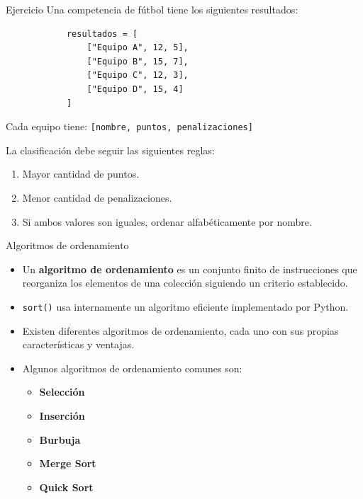 \documentclass{beamer}
\begin{document}
    \begin{frame}[fragile, t]{Ejercicio}
        Una competencia de fútbol tiene los siguientes resultados:
        \begin{verbatim}
            resultados = [
                ["Equipo A", 12, 5],
                ["Equipo B", 15, 7],
                ["Equipo C", 12, 3],
                ["Equipo D", 15, 4]
            ]
        \end{verbatim}
        Cada equipo tiene: \texttt{[nombre, puntos, penalizaciones]}

        La clasificación debe seguir las siguientes reglas:
        \begin{enumerate}
            \item Mayor cantidad de puntos.
            \item Menor cantidad de penalizaciones.
            \item Si ambos valores son iguales, ordenar alfabéticamente por nombre.
        \end{enumerate}
    \end{frame}

    \begin{frame}{Algoritmos de ordenamiento}
        \begin{itemize}
            \item Un \textbf{algoritmo de ordenamiento} es un conjunto finito de instrucciones 
            que reorganiza los elementos de una colección siguiendo un criterio establecido.
            \pause
            \item \texttt{sort()} usa internamente un algoritmo eficiente
            implementado por Python.
            \pause
            \item Existen diferentes algoritmos de ordenamiento, cada uno con sus propias características y ventajas.
            \pause
            \item Algunos algoritmos de ordenamiento comunes son:
            \begin{itemize}
                \item \textbf{Selección}
                \item \textbf{Inserción}
                \item \textbf{Burbuja}
                \item \textbf{Merge Sort}
                \item \textbf{Quick Sort} 
            \end{itemize}
        \end{itemize}
    \end{frame}
\end{document}
